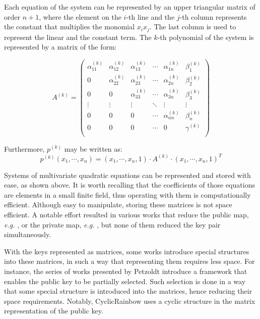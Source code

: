 \documentclass{ufsctex/ufsctex}
\begin{document}
Each equation of the system can be represented by an upper triangular matrix of
order $n+1$, where the element on the $i$-th line and the $j$-th column
represents the constant that multiplies the monomial $x_i x_j$. The last column
is used to represent the linear and the constant term. The $k$-th polynomial of
the system is represented by a matrix of the form:

\begin{equation}\label{eq:matrixrepresentation}
A^{(k)} =
\begin{pmatrix}
\alpha^{(k)}_{11} & \alpha^{(k)}_{12} & \alpha^{(k)}_{13} & \cdots &
	\alpha^{(k)}_{1n} & \beta^{(k)}_1 \\
0 & \alpha^{(k)}_{22} & \alpha^{(k)}_{23} & \cdots &
	\alpha^{(k)}_{2n} & \beta^{(k)}_2 \\
0 & 0 & \alpha^{(k)}_{33} & \cdots &
	\alpha^{(k)}_{3n} & \beta^{(k)}_3 \\
\vdots & \vdots & \vdots & \ddots & \vdots & \vdots \\
0 & 0 & 0 & \cdots & \alpha^{(k)}_{nn} & \beta^{(k)}_n \\
0 & 0 & 0 & \cdots & 0 & \gamma^{(k)} \\
\end{pmatrix}
\end{equation}

Furthermore, $p^{(k)}$ may be written as:
\begin{equation}
p^{(k)}(x_1,\cdots,x_n) =
	(x_1,\cdots,x_n,1) \cdot A^{(k)} \cdot (x_1,\cdots,x_n,1)^T
\end{equation}

Systems of multivariate quadratic equations can be represented and stored with
ease, as shown above. It is worth recalling that the coefficients of those
equations are elements in a small finite field, thus operating with them is
computationally efficient. Although easy to manipulate, storing these matrices
is not space efficient. A notable effort resulted in various works that reduce
the public map, \textit{e.g.} \cite{petzoldt2010cyclicrainbow}, or the private
map, \textit{e.g.} \cite{yasuda2012reducing}, but none of them reduced the key
pair simultaneously.

With the keys represented as matrices, some works introduce special structures
into these matrices, in such a way that representing them requires less space.
For instance, the series of works presented by Petzoldt introduce a framework
that enables the public key to be partially selected. Such selection is done in
a way that some special structure is introduced into the matrices, hence
reducing their space requirements. Notably, CyclicRainbow uses a cyclic
structure in the matrix representation of the public key.
\end{document}
